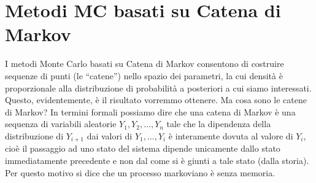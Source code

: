 %


\section{Metodi MC basati su Catena di Markov}
\label{sec:mmmc}


I metodi Monte Carlo basati su Catena di Markov consentono di costruire sequenze di punti (le \enquote{catene}) nello spazio dei parametri, la cui densità è proporzionale alla distribuzione di probabilità a posteriori a cui siamo interessati.
Questo, evidentemente, è il risultato vorremmo ottenere.
Ma cosa sono le catene di Markov?
In termini formali possiamo dire che una catena di Markov è una sequenza di variabili aleatorie $Y_{1}, Y_{2},\dots, Y_{n}$ tale che la dipendenza della distribuzione di $Y_{i+1}$ dai valori di $Y_{1}, \dots, Y_{i}$ è interamente dovuta al valore di $Y_i$, cioè il passaggio ad uno stato del sistema dipende unicamente dallo stato immediatamente precedente e non dal come si è giunti a tale stato (dalla storia). 
Per questo motivo si dice che un processo markoviano è senza memoria. 

